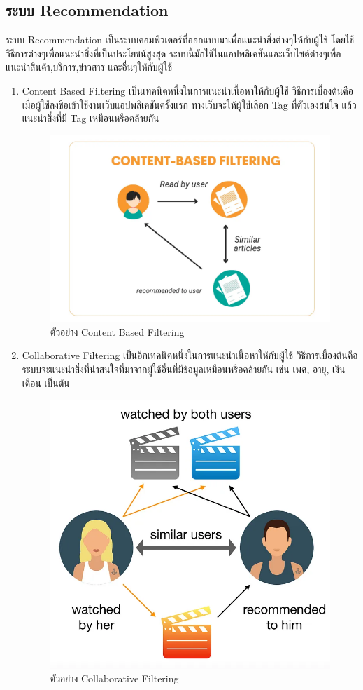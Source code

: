 \subsection{ระบบ Recommendation}
ระบบ Recommendation เป็นระบบคอมพิวเตอร์ที่ออกแบบมาเพื่อแนะนำสิ่งต่างๆให้กับผู้ใช้ โดยใช้วิธีการต่างๆเพื่อแนะนำสิ่งที่เป็นประโยชน์สูงสุด ระบบนี้มักใช้ในแอปพลิเคชันและเว็บไซต์ต่างๆเพื่อแนะนำสินค้า,บริการ,ข่าวสาร และอื่นๆให้กับผู้ใช้
\cite{recom}
\begin{enumerate}
    \item Content Based Filtering เป็นเทคนิคหนึ่งในการแนะนำเนื้อหาให้กับผู้ใช้ วิธีการเบื้องต้นคือ เมื่อผู้ใช้ลงชื่อเข้าใช้งานเว็บแอปพลิเคชันครั้งแรก ทางเว็บจะให้ผู้ใช้เลือก Tag ที่ตัวเองสนใจ แล้วแนะนำสิ่งที่มี Tag เหมือนหรือคล้ายกัน 
    \begin{figure}[h] %
        \begin{center}
        \includegraphics[width=0.6\linewidth]{image/content_base.png}
        \end{center}
        \caption[Poem]{ตัวอย่าง Content Based Filtering\cite{content_based}}
        \label{fig:content_based}
        \end{figure}
    \item Collaborative Filtering เป็นอีกเทคนิคหนึ่งในการแนะนำเนื้อหาให้กับผู้ใช้ วิธีการเบื้องต้นคือ ระบบจะแนะนำสิ่งที่น่าสนใจที่มาจากผู้ใช้อื่นที่มีข้อมูลเหมือนหรือคล้ายกัน เช่น เพศ, อายุ, เงินเดือน เป็นต้น 
    \begin{figure}[h] %
        \begin{center}
        \includegraphics[width=0.6\linewidth]{image/collaborative.png}
        \end{center}
        \caption[Poem]{ตัวอย่าง Collaborative Filtering\cite{collaborative}}
        \label{fig:collaborative_filtering}
        \end{figure}
\end{enumerate}
\FloatBarrier


